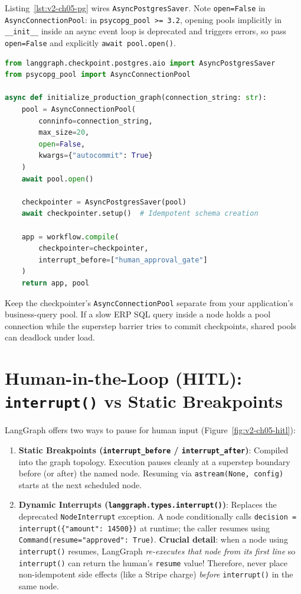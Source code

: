 Listing~\ref{lst:v2-ch05-pg} wires \texttt{AsyncPostgresSaver}. Note \texttt{open=False} in \texttt{AsyncConnectionPool}: in \texttt{psycopg\_pool >= 3.2}, opening pools implicitly in \texttt{\_\_init\_\_} inside an async event loop is deprecated and triggers errors, so pass \texttt{open=False} and explicitly \texttt{await pool.open()}.

\begin{lstlisting}[language=Python, label={lst:v2-ch05-pg}, caption={Configuring \texttt{AsyncPostgresSaver} with \texttt{AsyncConnectionPool(open=False)}}]
from langgraph.checkpoint.postgres.aio import AsyncPostgresSaver
from psycopg_pool import AsyncConnectionPool

async def initialize_production_graph(connection_string: str):
    pool = AsyncConnectionPool(
        conninfo=connection_string,
        max_size=20,
        open=False,
        kwargs={"autocommit": True}
    )
    await pool.open()

    checkpointer = AsyncPostgresSaver(pool)
    await checkpointer.setup()  # Idempotent schema creation

    app = workflow.compile(
        checkpointer=checkpointer,
        interrupt_before=["human_approval_gate"]
    )
    return app, pool
\end{lstlisting}

\begin{productionwarningbox}
Keep the checkpointer's \texttt{AsyncConnectionPool} separate from your application's business-query pool. If a slow ERP SQL query inside a node holds a pool connection while the superstep barrier tries to commit checkpoints, shared pools can deadlock under load.
\end{productionwarningbox}

\section{Human-in-the-Loop (HITL): \texttt{interrupt()} vs Static Breakpoints}

LangGraph offers two ways to pause for human input (Figure~\ref{fig:v2-ch05-hitl}):
\begin{enumerate}[leftmargin=18pt]
  \item \textbf{Static Breakpoints (\texttt{interrupt\_before} / \texttt{interrupt\_after})}: Compiled into the graph topology. Execution pauses cleanly at a superstep boundary before (or after) the named node. Resuming via \texttt{astream(None, config)} starts at the next scheduled node.
  \item \textbf{Dynamic Interrupts (\texttt{langgraph.types.interrupt()})}: Replaces the deprecated \texttt{NodeInterrupt} exception. A node conditionally calls \texttt{decision = interrupt(\{"amount": 14500\})} at runtime; the caller resumes using \texttt{Command(resume={"approved": True})}. \textbf{Crucial detail}: when a node using \texttt{interrupt()} resumes, LangGraph \emph{re-executes that node from its first line} so \texttt{interrupt()} can return the human's \texttt{resume} value! Therefore, never place non-idempotent side effects (like a Stripe charge) \emph{before} \texttt{interrupt()} in the same node.
\end{enumerate}

